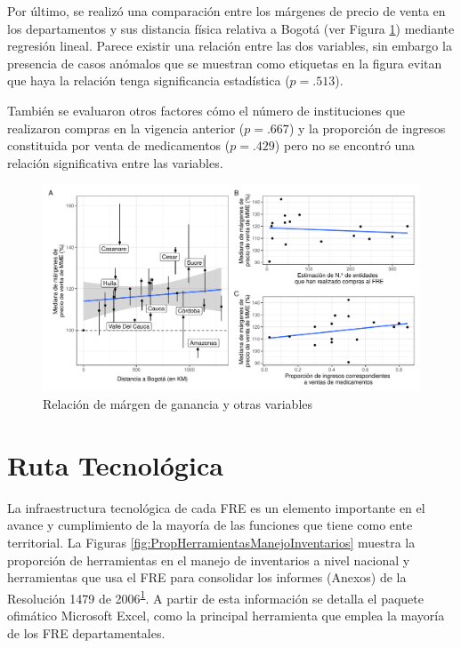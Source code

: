 \documentclass[
]{book}
\begin{document}
Por último, se realizó una comparación entre los márgenes de precio de venta en los departamentos y sus distancia física relativa a Bogotá (ver Figura \ref{fig:relacionMargenesCosto}) mediante regresión lineal. Parece existir una relación entre las dos variables, sin embargo la presencia de casos anómalos que se muestran como etiquetas en la figura evitan que haya la relación tenga significancia estadística (\(p = .513\)).

También se evaluaron otros factores cómo el número de instituciones que realizaron compras en la vigencia anterior (\(p = .667\)) y la proporción de ingresos constituida por venta de medicamentos (\(p = .429\)) pero no se encontró una relación significativa entre las variables.

\begin{figure}

{\centering \includegraphics[width=0.95\linewidth]{InformeFinal_files/figure-latex/relacionMargenesCosto-1} 

}

\caption{Relación de márgen de ganancia y otras variables}\label{fig:relacionMargenesCosto}
\end{figure}

\hypertarget{ruta-tecnoluxf3gica}{%
\chapter{Ruta Tecnológica}\label{ruta-tecnoluxf3gica}}


La infraestructura tecnológica de cada FRE es un elemento importante en el avance y cumplimiento de la mayoría de las funciones que tiene como ente territorial. La Figuras \ref{fig:PropHerramientasManejoInventarios} muestra la proporción de herramientas en el manejo de inventarios a nivel nacional y herramientas que usa el FRE para consolidar los informes (Anexos) de la Resolución 1479 de 2006\textsuperscript{\protect\hyperlink{ref-MSPS1479-2006}{1}}. A partir de esta información se detalla el paquete ofimático Microsoft Excel, como la principal herramienta que emplea la mayoría de los FRE departamentales.
\end{document}
